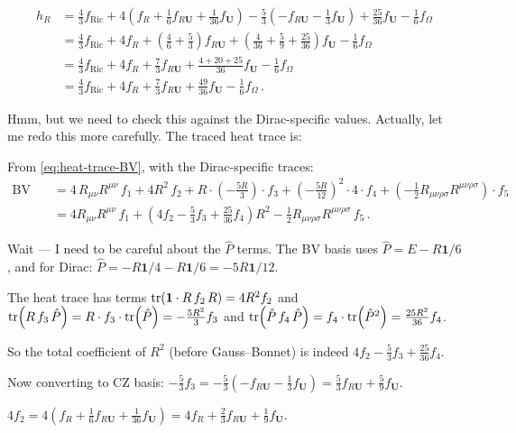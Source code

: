 \documentclass[11pt,a4paper]{article}
\newcommand{\Id}{\mathbf{1}}
\newcommand{\Ricsq}{R_{\mu\nu}R^{\mu\nu}}
\newcommand{\Rsq}{R_{\mu\nu\rho\sigma}R^{\mu\nu\rho\sigma}}
\theoremstyle{definition}
\theoremstyle{remark}
\begin{document}
\begin{align*}
  h_R &= \frac{4}{3}f_{\text{Ric}}
  + 4\!\left(f_R + \frac{1}{6}f_{R\mathbf{U}} + \frac{1}{36}f_{\mathbf{U}}\right)
  - \frac{5}{3}\!\left(-f_{R\mathbf{U}} - \frac{1}{3}f_{\mathbf{U}}\right)
  + \frac{25}{36}f_{\mathbf{U}}
  - \frac{1}{6}f_\Omega\\
  &= \frac{4}{3}f_{\text{Ric}} + 4f_R
  + \left(\frac{4}{6} + \frac{5}{3}\right)f_{R\mathbf{U}}
  + \left(\frac{4}{36} + \frac{5}{9} + \frac{25}{36}\right)f_{\mathbf{U}}
  - \frac{1}{6}f_\Omega\\
  &= \frac{4}{3}f_{\text{Ric}} + 4f_R
  + \frac{7}{3}f_{R\mathbf{U}}
  + \frac{4+20+25}{36}f_{\mathbf{U}}
  - \frac{1}{6}f_\Omega\\
  &= \frac{4}{3}f_{\text{Ric}} + 4f_R
  + \frac{7}{3}f_{R\mathbf{U}}
  + \frac{49}{36}f_{\mathbf{U}}
  - \frac{1}{6}f_\Omega\,.
\end{align*}

Hmm, but we need to check this against the Dirac-specific values.
Actually, let me redo this more carefully.  The traced heat trace is:

From \eqref{eq:heat-trace-BV}, with the Dirac-specific traces:
\begin{align*}
  \text{BV terms} &=
  4\,\Ricsq\,f_1
  + 4R^2\,f_2
  + R\cdot(-\frac{5R}{3})\cdot f_3
  + (-\frac{5R}{12})^2\cdot 4 \cdot f_4
  + (-\frac{1}{2}\Rsq)\cdot f_5\\
  &= 4\Ricsq\,f_1
  + \left(4f_2 - \frac{5}{3}f_3 + \frac{25}{36}f_4\right)R^2
  - \frac{1}{2}\Rsq\,f_5\,.
\end{align*}

Wait --- I need to be careful about the $\hat{P}$ terms.  The BV
basis uses $\hat{P} = E - R\Id/6$, and for Dirac:
$\hat{P} = -R\Id/4 - R\Id/6 = -5R\Id/12$.

The heat trace has terms
$\tr(\Id\cdot R\,f_2\,R) = 4R^2 f_2$ and
$\tr(R\,f_3\,\hat{P}) = R\cdot f_3\cdot\tr(\hat{P}) = -\frac{5R^2}{3}f_3$
and $\tr(\hat{P}\,f_4\,\hat{P}) = f_4\cdot\tr(\hat{P}^2) = \frac{25R^2}{36}f_4$.

So the total coefficient of $R^2$ (before Gauss--Bonnet) is indeed
$4f_2 - \frac{5}{3}f_3 + \frac{25}{36}f_4$.

Now converting to CZ basis:
$-\frac{5}{3}f_3 = -\frac{5}{3}(-f_{R\mathbf{U}} - \frac{1}{3}f_{\mathbf{U}})
= \frac{5}{3}f_{R\mathbf{U}} + \frac{5}{9}f_{\mathbf{U}}$.

$4f_2 = 4(f_R + \frac{1}{6}f_{R\mathbf{U}} + \frac{1}{36}f_{\mathbf{U}})
= 4f_R + \frac{2}{3}f_{R\mathbf{U}} + \frac{1}{9}f_{\mathbf{U}}$.
\end{document}
